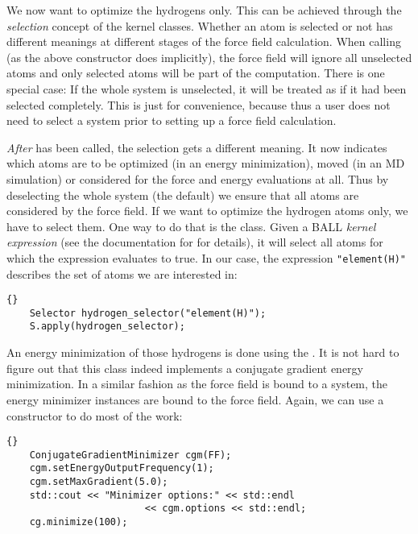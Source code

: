 We now want to optimize the hydrogens only. This can be achieved through the
{\em selection} concept of the kernel classes. Whether an atom is selected or
not has different meanings at different stages of the force field calculation.
When calling  (as the above constructor does implicitly),
the force field will ignore all unselected atoms and only selected atoms will
be part of the computation. There is one special case: If the whole system is
unselected, it will be treated as if it had been selected completely. This is
just for convenience, because thus a user does not need to select a system
prior to setting up a force field calculation.

{\em After}  has been called, the selection gets a different
meaning. It now indicates which atoms are to be optimized (in an energy
minimization), moved (in an MD simulation) or considered for the force and
energy evaluations at all. Thus by deselecting the whole system (the default)
we ensure that all atoms are considered by the force field. If we want to
optimize the hydrogen atoms only, we have to select them. One way to do that
is the  class. Given a BALL {\em kernel expression} (see the
documentation for  for details), it will select all atoms
for which the expression evaluates to true. In our case, the expression 
{\tt "element(H)"} describes the set of atoms we are interested in:

\begin{lstlisting}{}
	Selector hydrogen_selector("element(H)");
	S.apply(hydrogen_selector);
\end{lstlisting}

\noindent
An energy minimization of those hydrogens is done using the
. It is not hard to figure out that this
class indeed implements a conjugate gradient energy minimization.
In a similar fashion as the force field is bound to a system, the 
energy minimizer instances are bound to the force field. Again, we can use a
constructor to do most of the work:

\begin{lstlisting}{}
	ConjugateGradientMinimizer cgm(FF);
	cgm.setEnergyOutputFrequency(1);
	cgm.setMaxGradient(5.0);
	std::cout << "Minimizer options:" << std::endl 
						<< cgm.options << std::endl;
	cg.minimize(100);
\end{lstlisting}

